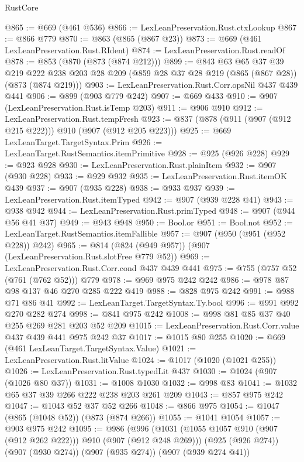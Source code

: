 \begin{lexlean}{RustCore}
\begin{coremodule}
@865 := @669 (@461 @536)
@866 := LexLeanPreservation.Rust.ctxLookup
@867 := @866 @779
@870 := @863 (@865 (@867 @23))
@873 := @669 (@461 LexLeanPreservation.Rust.RIdent)
@874 := LexLeanPreservation.Rust.readOf
@878 := @853 (@870 (@873 (@874 @212)))
@899 := @843
    @63
    @65
    @37
    @39
    @219
    @222
    @238
    @203
    @28
    @209
    (@859 @28 @37 @28 @219 (@865 (@867 @28)) (@873 (@874 @219)))
@903 := LexLeanPreservation.Rust.Corr.opsNil @437 @439 @441
@906 := @899 (@903 @779 @242)
@907 := @669 @433
@910 := @907 (LexLeanPreservation.Rust.isTemp @203)
@911 := @906 @910
@912 := LexLeanPreservation.Rust.tempFresh
@923 := @837 (@878 (@911 (@907 (@912 @215 @222))) @910 (@907 (@912 @205 @223)))
@925 := @669 LexLeanTarget.TargetSyntax.Prim
@926 := LexLeanTarget.RustSemantics.itemPrimitive
@928 := @925 (@926 @228)
@929 := @923 @928
@930 := LexLeanPreservation.Rust.plainItem
@932 := @907 (@930 @228)
@933 := @929 @932
@935 := LexLeanPreservation.Rust.itemOK @439
@937 := @907 (@935 @228)
@938 := @933 @937
@939 := LexLeanPreservation.Rust.itemTyped
@942 := @907 (@939 @228 @41)
@943 := @938 @942
@944 := LexLeanPreservation.Rust.primTyped
@948 := @907 (@944 @56 @41 @37)
@949 := @943 @948
@950 := Bool.or
@951 := Bool.not
@952 := LexLeanTarget.RustSemantics.itemFallible
@957 := @907 (@950 (@951 (@952 @228)) @242)
@965 := @814 (@824 (@949 @957)) (@907 (LexLeanPreservation.Rust.slotFree @779 @52))
@969 := LexLeanPreservation.Rust.Corr.cond @437 @439 @441
@975 := @755 (@757 @52 (@761 (@762 @52))) @779
@978 := @969 @975 @242 @242
@986 := @978 @87 @98 @137 @46 @270 @285 @222 @419
@988 := @828 @975 @242
@991 := @988 @71 @86 @41
@992 := LexLeanTarget.TargetSyntax.Ty.bool
@996 := @991 @992 @270 @282 @274
@998 := @841 @975 @242
@1008 := @998 @81 @85 @37 @40 @255 @269 @281 @203 @52 @209
@1015 := LexLeanPreservation.Rust.Corr.value @437 @439 @441 @975 @242 @37
@1017 := @1015 @80 @255
@1020 := @669 (@461 LexLeanTarget.TargetSyntax.Value)
@1021 := LexLeanPreservation.Rust.litValue
@1024 := @1017 (@1020 (@1021 @255))
@1026 := LexLeanPreservation.Rust.typedLit @437
@1030 := @1024 (@907 (@1026 @80 @37))
@1031 := @1008 @1030
@1032 := @998 @83
@1041 := @1032 @65 @37 @39 @266 @222 @238 @203 @261 @209
@1043 := @857 @975 @242
@1047 := @1043 @52 @37 @52 @266
@1048 := @866 @975
@1054 := @1047 (@865 (@1048 @52)) (@873 (@874 @266))
@1055 := @1041 @1054
@1057 := @903 @975 @242
@1095 := @986
    (@996
      (@1031 (@1055 @1057 @910 (@907 (@912 @262 @222))) @910 (@907 (@912 @248 @269)))
      (@925 (@926 @274))
      (@907 (@930 @274))
      (@907 (@935 @274))
      (@907 (@939 @274 @41))

\end{coremodule}
\end{lexlean}
